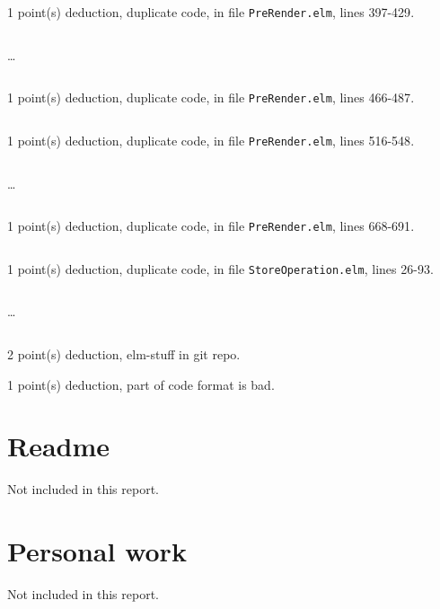 \documentclass{article}
\begin{document}
\inputminted[firstline=255,lastline=274]{elm}{PreRender.elm}

1 point(s) {\color{red}deduction}, duplicate code, in file {\color{blue}\texttt{PreRender.elm}}, lines {\color{blue}397-429}.

\inputminted[firstline=397,lastline=406]{elm}{PreRender.elm}

\dots

\inputminted[firstline=420,lastline=429]{elm}{PreRender.elm}

1 point(s) {\color{red}deduction}, duplicate code, in file {\color{blue}\texttt{PreRender.elm}}, lines {\color{blue}466-487}.

\inputminted[firstline=466,lastline=487]{elm}{PreRender.elm}

1 point(s) {\color{red}deduction}, duplicate code, in file {\color{blue}\texttt{PreRender.elm}}, lines {\color{blue}516-548}.

\inputminted[firstline=516,lastline=525]{elm}{PreRender.elm}

\dots

\inputminted[firstline=539,lastline=548]{elm}{PreRender.elm}

1 point(s) {\color{red}deduction}, duplicate code, in file {\color{blue}\texttt{PreRender.elm}}, lines {\color{blue}668-691}.

\inputminted[firstline=668,lastline=691]{elm}{PreRender.elm}

1 point(s) {\color{red}deduction}, duplicate code, in file {\color{blue}\texttt{StoreOperation.elm}}, lines {\color{blue}26-93}.

\inputminted[firstline=26,lastline=35]{elm}{StoreOperation.elm}

\dots

\inputminted[firstline=84,lastline=93]{elm}{StoreOperation.elm}

2 point(s) {\color{red}deduction}, elm-stuff in git repo.\medskip

1 point(s) {\color{red}deduction}, part of code format is bad.\medskip



\newpage

\section{Readme}

Not included in this report.

\section{Personal work}

Not included in this report.


\newpage
\end{document}
